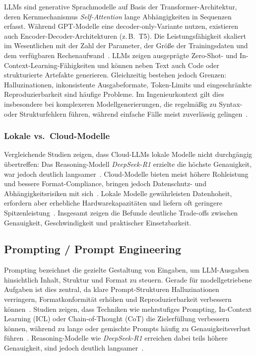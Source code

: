 \documentclass[runningheads]{llncs}
\begin{document}
LLMs sind generative Sprachmodelle auf Basis der Transformer-Architektur, deren Kernmechanismus \emph{Self-Attention} lange Abhängigkeiten in Sequenzen erfasst. Während GPT-Modelle eine decoder-only-Variante nutzen, existieren auch Encoder-Decoder-Architekturen (z.\,B.\ T5). Die Leistungsfähigkeit skaliert im Wesentlichen mit der Zahl der Parameter, der Größe der Trainingsdaten und dem verfügbaren Rechenaufwand~\cite{ref_article5,ref_book2_steinig2023}. 
LLMs zeigen ausgeprägte Zero-Shot- und In-Context-Learning-Fähigkeiten und können neben Text auch Code oder strukturierte Artefakte generieren. Gleichzeitig bestehen jedoch Grenzen: Halluzinationen, inkonsistente Ausgabeformate, Token-Limits und eingeschränkte Reproduzierbarkeit sind häufige Probleme. Im Ingenieurkontext gilt dies insbesondere bei komplexeren Modellgenerierungen, die regelmäßig zu Syntax- oder Strukturfehlern führen, während einfache Fälle meist zuverlässig gelingen~\cite{ref_proc1,ref_article5}.

\subsubsection{Lokale vs.\ Cloud-Modelle}

Vergleichende Studien zeigen, dass Cloud-LLMs lokale Modelle nicht durchgängig übertreffen: Das Reasoning-Modell \emph{DeepSeek-R1} erzielte die höchste Genauigkeit, war jedoch deutlich langsamer~\cite{ref_preprint_wang2025}. Cloud-Modelle bieten meist höhere Rohleistung und bessere Format-Compliance, bringen jedoch Datenschutz- und Abhängigkeitsrisiken mit sich~\cite{ref_book2_steinig2023}. Lokale Modelle gewährleisten Datenhoheit, erfordern aber erhebliche Hardwarekapazitäten und liefern oft geringere Spitzenleistung~\cite{ref_article5}. Insgesamt zeigen die Befunde deutliche Trade-offs zwischen Genauigkeit, Geschwindigkeit und praktischer Einsetzbarkeit.

\subsection{Prompting / Prompt Engineering}

Prompting bezeichnet die gezielte Gestaltung von Eingaben, um LLM-Ausgaben hinsichtlich Inhalt, Struktur und Format zu steuern. Gerade für modellgetriebene Aufgaben ist dies zentral, da klare Prompt-Strukturen Halluzinationen verringern, Formatkonformität erhöhen und Reproduzierbarkeit verbessern können~\cite{ref_article5}. Studien zeigen, dass Techniken wie mehrstufiges Prompting, In-Context Learning (ICL) oder Chain-of-Thought (CoT) die Zielerfüllung verbessern können, während zu lange oder gemischte Prompts häufig zu Genauigkeitsverlust führen~\cite{ref_proc1}. Reasoning-Modelle wie \emph{DeepSeek-R1} erreichen dabei teils höhere Genauigkeit, sind jedoch deutlich langsamer~\cite{ref_preprint_wang2025}.
\end{document}
